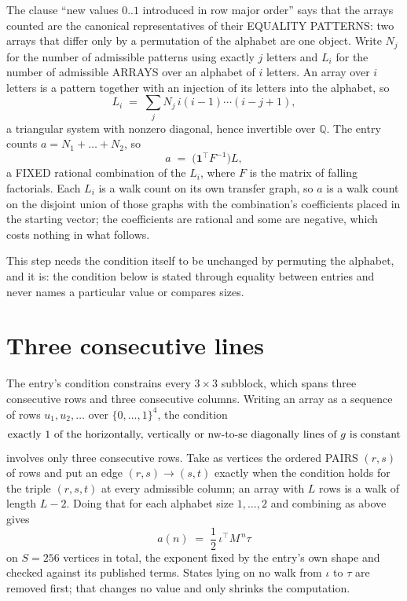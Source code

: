 \documentclass[11pt,a4paper]{article}
\theoremstyle{plain}
\theoremstyle{definition}
\begin{document}
The clause ``new values $0..1$ introduced in row major order'' says that the arrays
counted are the canonical representatives of their EQUALITY PATTERNS: two arrays that differ
only by a permutation of the alphabet are one object. Write $N_j$ for the number of admissible
patterns using exactly $j$ letters and $L_i$ for the number of admissible ARRAYS over an
alphabet of $i$ letters. An array over $i$ letters is a pattern together with an injection of
its letters into the alphabet, so
\[
L_i\;=\;\sum_{j}N_j\,i(i-1)\cdots(i-j+1),
\]
a triangular system with nonzero diagonal, hence invertible over $\mathbb{Q}$. The entry
counts $a=N_1+\dots+N_{2}$, so
\[
a\;=\;\bigl(\mathbf{1}^{\!\top}F^{-1}\bigr)L ,
\]
a FIXED rational combination of the $L_i$, where $F$ is the matrix of falling factorials.
Each $L_i$ is a walk count on its own transfer graph, so $a$ is a walk count on the disjoint
union of those graphs with the combination's coefficients placed in the starting vector; the
coefficients are rational and some are negative, which costs nothing in what follows.

This step needs the condition itself to be unchanged by permuting the alphabet, and it is:
the condition below is stated through equality between entries and never names a particular
value or compares sizes.

\section{Three consecutive lines}

The entry's condition constrains every $3\times3$ subblock, which spans three consecutive
rows and three consecutive columns. Writing an array as a sequence of rows
$u_1,u_2,\dots$ over $\{0,\dots,1\}^{4}$, the condition
\[
\text{exactly }1\text{ of the horizontally, vertically or nw-to-se diagonally lines of }g\text{ \text{is constant}}
\]
involves only three consecutive rows. Take as vertices the ordered PAIRS $(r,s)$ of
rows and put an edge $(r,s)\to(s,t)$ exactly when the condition holds for the triple
$(r,s,t)$ at every admissible column; an array with $L$ rows is a walk of length $L-2$.
Doing that for each alphabet size $1,\dots,2$ and combining as above gives
\[
a(n)\;=\;\frac{1}{2}\,\iota^{\!\top}M^{\,n}\tau
\]
on $S=256$ vertices in total, the exponent fixed by the entry's own shape and checked against
its published terms. States lying on no walk from $\iota$ to $\tau$ are removed first; that
changes no value and only shrinks the computation.
\end{document}
